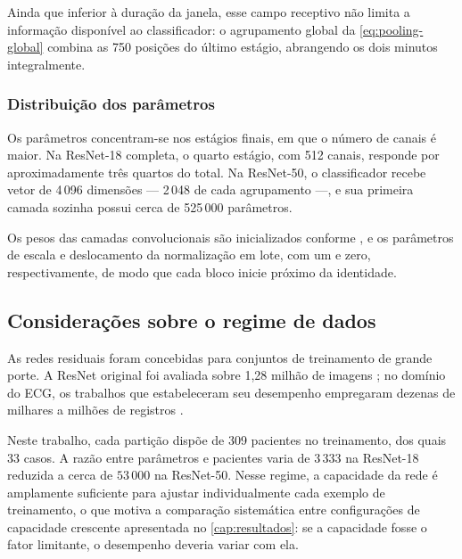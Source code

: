 Ainda que inferior à duração da janela, esse campo receptivo não limita a
informação disponível ao classificador: o agrupamento global da
\autoref{eq:pooling-global} combina as 750 posições do último estágio,
abrangendo os dois minutos integralmente.

\subsubsection{Distribuição dos parâmetros}
\label{subsubsec:fund-resnet-parametros}

Os parâmetros concentram-se nos estágios finais, em que o número de canais é
maior. Na ResNet-18 completa, o quarto estágio, com 512 canais, responde por
aproximadamente três quartos do total. Na ResNet-50, o classificador recebe
vetor de 4\,096 dimensões --- 2\,048 de cada agrupamento ---, e sua primeira
camada sozinha possui cerca de 525\,000 parâmetros.

Os pesos das camadas convolucionais são inicializados conforme
, e os parâmetros de escala e deslocamento da
normalização em lote, com um e zero, respectivamente, de modo que cada bloco
inicie próximo da identidade.

\subsection{Considerações sobre o regime de dados}
\label{subsec:fund-resnet-regime}

As redes residuais foram concebidas para conjuntos de treinamento de grande
porte. A ResNet original foi avaliada sobre 1,28 milhão de imagens
\cite{he2016deep}; no domínio do \gls{ECG}, os trabalhos que estabeleceram
seu desempenho empregaram dezenas de milhares a milhões de registros
\cite{hannun2019cardiologist,ribeiro2020automatic}.

Neste trabalho, cada partição dispõe de 309 pacientes no treinamento, dos
quais 33 casos. A razão entre parâmetros e pacientes varia de $3\,333$ na
ResNet-18 reduzida a cerca de $53\,000$ na ResNet-50. Nesse regime, a
capacidade da rede é amplamente suficiente para ajustar individualmente cada
exemplo de treinamento, o que motiva a comparação sistemática entre
configurações de capacidade crescente apresentada no
\autoref{cap:resultados}: se a capacidade fosse o fator limitante, o
desempenho deveria variar com ela.


